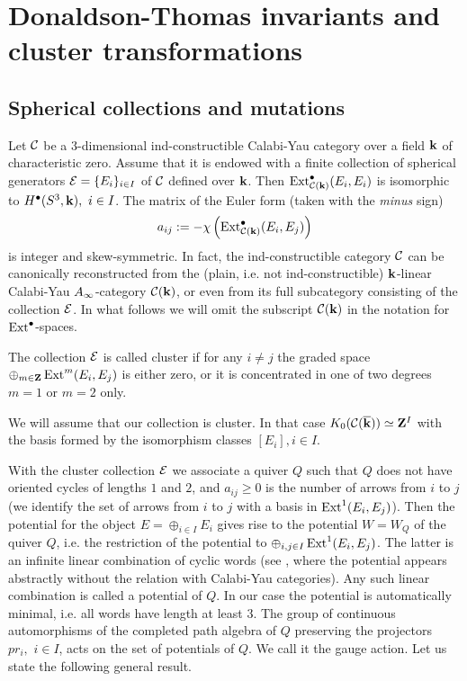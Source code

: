 \documentclass[12pt]{article}
\begin{document}
\section{Donaldson-Thomas invariants and cluster transformations}

\subsection{Spherical collections and mutations}


Let ${\cal C}$ be a $3$-dimensional  ind-constructible Calabi-Yau category over a field ${\bf k}$ of characteristic zero. Assume that it is endowed with a finite collection of spherical generators
${\cal E}=\{E_i\}_{i\in I}$ of ${\cal C}$ defined over ${\bf k}$.  Then
$\operatorname{Ext}_{\cal C({\bf k})}^\bullet(E_i,E_i)$ is
isomorphic to $H^{\bullet}(S^3,{\bf k} ), \,\,i\in I$.
The  matrix of the Euler form (taken with the {\it minus} sign)
$$a_{ij}:=-\chi\left(\operatorname{Ext}_{\cal C({\bf k})}^{\bullet}(E_i,E_j)\right)$$
is integer and skew-symmetric.
 In fact, the ind-constructible category   ${\cal C}$ can be canonically reconstructed from the (plain, i.e. not ind-constructible)
 ${\bf k}$-linear Calabi-Yau $A_{\infty}$-category ${\mathcal C}({\bf k})$, or even from its full subcategory consisting of the collection ${\cal E}$.
 In what follows we will omit the subscript ${\mathcal C}({\bf k})$ in the notation for $\operatorname{Ext}^\bullet$-spaces.

\begin{defn} The collection ${\cal E}$ is called cluster if for any $i\ne j$ the graded space $\oplus_{m\in {\bf Z}} \operatorname{Ext}^m(E_i,E_j)$ is either zero, or it is concentrated
 in one of two degrees $m=1$ or $m=2$ only.

\end{defn}

We will assume that our collection is cluster. In that case $K_0({\mathcal C}({\overline{\bf k}}))\simeq {\bf Z}^I$ with the basis formed by the isomorphism classes $[E_i], i\in I$. 


With the cluster collection ${\cal E}$ we  associate a quiver $Q$ such that
$Q$ does not have oriented cycles of lengths $1$ and $2$, and $a_{ij}\geqslant 0$ is the number of arrows from $i$ to $j$ (we identify the set of arrows from $i$ to $j$ with a basis in $\operatorname{Ext}^1(E_i,E_j)$).
Then the potential for the object $E=\oplus_{i\in I}E_i$ gives rise to the potential $W=W_Q$
of the quiver $Q$, i.e. the restriction of the potential to $\oplus_{i,j\in I} \operatorname{Ext}^1(E_i,E_j)$. 
The latter is an infinite linear combination of cyclic words (see \cite{DWZe}, \cite{Ze} where the potential appears abstractly without the relation with Calabi-Yau categories). Any such linear combination is called a potential of $Q$. In our case the potential is automatically minimal, i.e. all words have length at least $3$. The group of continuous automorphisms of the completed path algebra of $Q$ preserving the projectors $pr_i,\,\,i\in I$, acts on the set of potentials of $Q$.
 We call it the gauge action.
Let us state the following general result.
\end{document}
